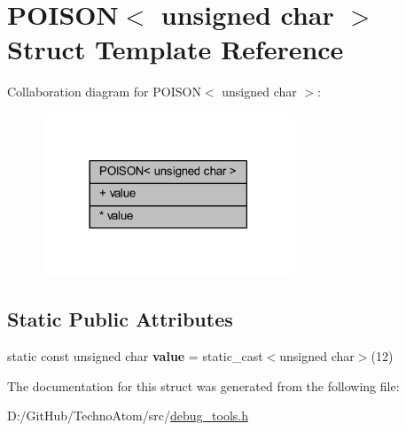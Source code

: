 \hypertarget{struct_p_o_i_s_o_n_3_01unsigned_01char_01_4}{}\section{P\+O\+I\+S\+ON$<$ unsigned char $>$ Struct Template Reference}
\label{struct_p_o_i_s_o_n_3_01unsigned_01char_01_4}


Collaboration diagram for P\+O\+I\+S\+ON$<$ unsigned char $>$\+:
\nopagebreak
\begin{figure}[H]
\begin{center}
\leavevmode
\includegraphics[width=213pt]{struct_p_o_i_s_o_n_3_01unsigned_01char_01_4__coll__graph}
\end{center}
\end{figure}
\subsection*{Static Public Attributes}
\textbf{ }\par
\begin{DoxyCompactItemize}
\item 
\mbox{\label{struct_p_o_i_s_o_n_3_01unsigned_01char_01_4_a7d966240ad6bf556979b7f6c8fecfd37}} 
static const unsigned char {\bfseries value} = static\+\_\+cast$<$unsigned char$>$(12)
\end{DoxyCompactItemize}



The documentation for this struct was generated from the following file\+:\begin{DoxyCompactItemize}
\item 
D\+:/\+Git\+Hub/\+Techno\+Atom/src/\hyperlink{debug__tools_8h}{debug\+\_\+tools.\+h}\end{DoxyCompactItemize}
